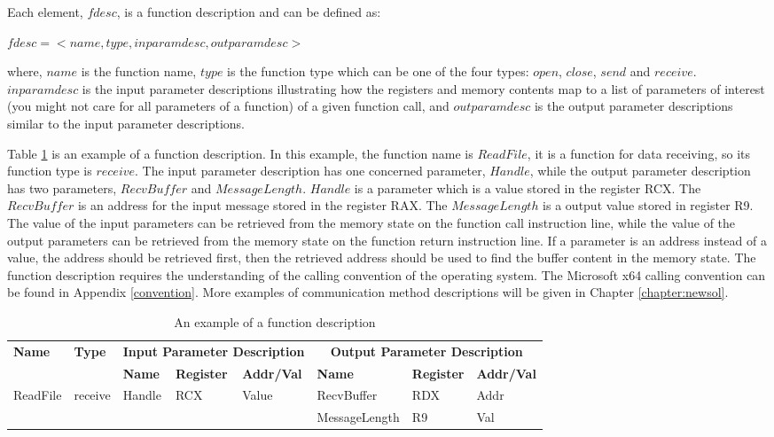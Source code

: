 \documentclass[12pt,oneside]{book}
\begin{document}
Each element, $fdesc$, is a function description and can be defined as:

$fdesc = < name, type, inparamdesc, outparamdesc >$

where, $name$ is the function name, $type$ is the function type which can be one of the four types: $open$, $close$, $send$ and $receive$. $inparamdesc$ is the input parameter descriptions illustrating how the registers and memory contents map to a list of parameters of interest (you might not care for all parameters of a function) of a given function call, and $outparamdesc$ is the output parameter descriptions similar to the input parameter descriptions. 

Table \ref{functionexample} is an example of a function description. In this example, the function name is $ReadFile$, it is a function for data receiving, so its function type is $receive$. The input parameter description has one concerned parameter, $Handle$, while the output parameter description has two parameters, ${RecvBuffer}$ and $MessageLength$. $Handle$ is a parameter which is a value stored in the register RCX. The $RecvBuffer$ is an address for the input message stored in the register RAX. The $MessageLength$ is a output value stored in register R9. The value of the input parameters can be retrieved from the memory state on the function call instruction line, while the value of the output parameters can be retrieved from the memory state on the function return instruction line. If a parameter is an address instead of a value, the address should be retrieved first, then the retrieved address should be used to find the buffer content in the memory state. The function description requires the understanding of the calling convention of the operating system. The Microsoft x64 calling convention can be found in Appendix \ref{convention}. More examples of communication method descriptions will be given in Chapter \ref{chapter:newsol}.

\begin{table}[H]
        \centering
        \caption{An example of a function description}
        \label{functionexample}
        \begin{tabular}{|l|l|l|l|l|l|l|l|}
            \hline
             \multirow{2}{*}{{\textbf{Name}}} & \multirow{2}{*}{{\textbf{Type}}} & \multicolumn{3}{c|}{\textbf{Input Parameter Description}} & \multicolumn{3}{c|}{\textbf{Output Parameter Description}} \\
              \cline{3-8} 
             & & \textbf{Name}& \textbf{Register} &  \textbf{Addr/Val} & \textbf{Name}& \textbf{Register} &  \textbf{Addr/Val}  \\
             \hline
             \multirow{2}{*}{ReadFile}
             &\multirow{2}{*}{receive} &  \multirow{2}{*}{Handle} & \multirow{2}{*}{RCX} & \multirow{2}{*}{Value} & RecvBuffer & RDX  & Addr\\
              \cline{6-8} 
             & & & & & MessageLength & R9  & Val\\
            \hline            
        \end{tabular}
    \end{table}
\end{document}
